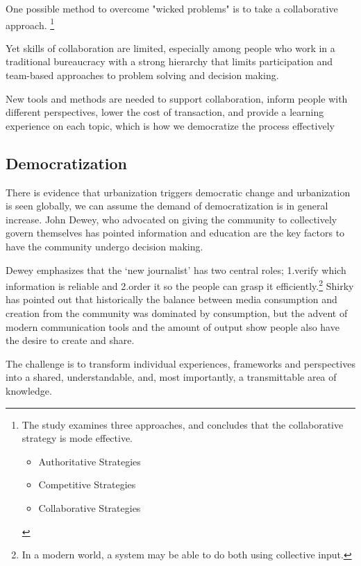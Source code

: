 One possible method to overcome "wicked problems" is to take
a collaborative approach. \cite{roberts2000wicked}
\footnote{ The study examines three approaches, and concludes that the
  collaborative strategy is mode effective.
  \begin{itemize}
    \item Authoritative Strategies
    \item Competitive Strategies
    \item Collaborative Strategies
  \end{itemize}
}

Yet skills of collaboration are limited, especially among people who work
in a traditional bureaucracy with a strong hierarchy that limits
participation and team-based approaches to problem solving and decision
making.

New tools and methods are needed to support collaboration, inform people with different
perspectives, lower the cost of transaction, and provide a learning
experience on each topic, which is how we democratize the process
effectively

\subsection{Democratization}

There is evidence that urbanization triggers democratic
change\cite{woolley2010evidence} and urbanization is seen globally, 
we can assume the demand of democratization is in general increase.
John Dewey, who advocated on giving the community to collectively govern
themselves has pointed information and education are the key factors to
have the community undergo decision making.\cite{dewey2012public} 

Dewey emphasizes that the `new journalist' has two central roles; 1.verify
which information is reliable and 2.order it so the people can grasp it
efficiently.\footnote{ In a modern world, a system may be able to
do both using collective input.}
Shirky has pointed out that historically the balance between media
consumption and creation from the community was dominated by consumption,
but the advent of modern communication tools and the amount of output show
people also have the desire to create and share\cite{shirky2008here}.


The challenge is to transform individual experiences, frameworks and
perspectives into a shared, understandable, and, most importantly, a
transmittable area of knowledge.

